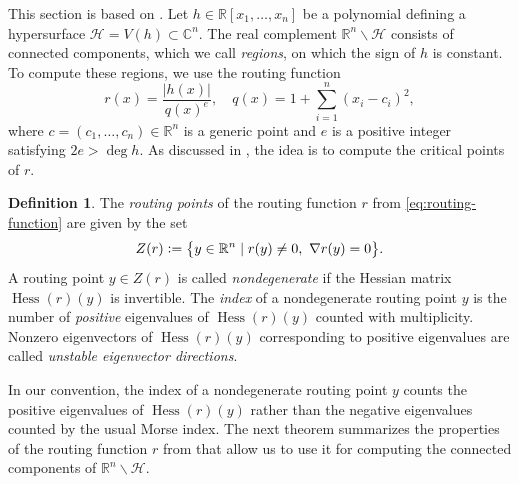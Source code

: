 \documentclass[11pt]{article}
\numberwithin{equation}{section}
\theoremstyle{plain}
\theoremstyle{definition}
\newtheorem{definition}[theorem]{Definition}
\theoremstyle{remark}
\newcommand{\sH}{{\mathcal H}}
\newcommand\bC{{\mathbb C}}
\newcommand\bR{{\mathbb R}}
\DeclareMathOperator*{\Hess}{Hess}
\begin{document}
This section is based on \cite[Sections 2 and 3]{SmoothConnectivity}. Let $h\in\bR[x_1,\ldots,x_n]$ be a polynomial defining a hypersurface $\sH = V(h)\subset \bC^{n}$. The real complement $\bR^{n}\smallsetminus \sH$ consists of connected components, which we call \emph{regions}, on which the sign of $h$ is constant. To compute these regions, we use the routing function
\begin{equation}\label{eq:routing-function}
    r(x) = \frac{\vert h(x)\vert }{q(x)^{e}},\quad q(x)  = 1 + \sum_{i=1}^{n}(x_{i}-c_{i})^{2},
\end{equation}
where $c = (c_{1},\dots,c_{n}) \in \bR^{n}$ is a generic point and $e$ is a positive integer satisfying $2e > \deg h$. As discussed in , the idea is to compute the critical points of $r$. 

\begin{definition}\label{def:routing_points}
The \emph{routing points} of the routing function $r$ from \eqref{eq:routing-function} are given by the set 
\begin{equation*}
    Z(r) \vcentcolon = \bigl\{y\in\bR^{n}\mid r(y)\neq 0,\ \nabla r(y)=0\bigr\}.
\end{equation*}
A routing point $y\in Z(r)$ is called {\em nondegenerate} if the Hessian matrix $\Hess(r)(y)$ is invertible. The {\em index} of a nondegenerate routing point $y$ is the number of \emph{positive} eigenvalues of $\Hess(r)(y)$ counted with multiplicity. Nonzero eigenvectors of $\Hess(r)(y)$ corresponding to positive eigenvalues are called {\em unstable eigenvector directions}. 
\end{definition}

In our convention, the index of a nondegenerate routing point $y$ counts the positive eigenvalues of $\Hess(r)(y)$ rather than the negative eigenvalues counted by the usual Morse index. 
The next theorem summarizes the properties of the routing function $r$ from \cite{SmoothConnectivity} that allow us to use it for computing the connected components of $\bR^{n}\smallsetminus \sH$.
\end{document}
